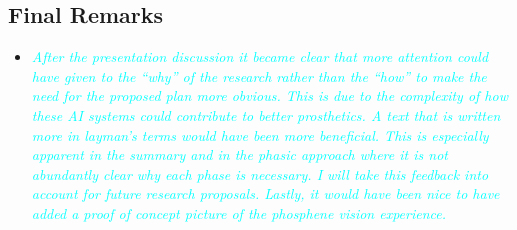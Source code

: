 \documentclass[10pt]{article}
\begin{document}
\subsection*{Final Remarks}
\begin{itemize}
  \item \textcolor{cyan}{\textit{After the presentation discussion it became clear that more
            attention could have given to the ``why'' of the research rather than the ``how''
            to make the need for the proposed plan more obvious. This is due to the
            complexity of how these AI systems could contribute to better prosthetics. A
            text that is written more in layman's terms would have been more beneficial.
            This is especially apparent in the summary and in the phasic approach where it
            is not abundantly clear why each phase is necessary. I will take this
            feedback into account for future research proposals. Lastly, it would have
            been nice to have added a proof of concept picture of the phosphene vision experience.}}
\end{itemize}
\end{document}
